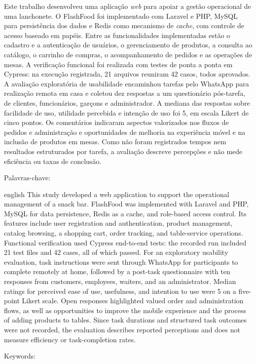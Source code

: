 \begin{resumo}
  \vspace{-15pt}
  
  Este trabalho desenvolveu uma aplicação \textit{web} para apoiar a gestão operacional de uma lanchonete. O FlashFood foi implementado com Laravel e PHP, MySQL para persistência dos dados e Redis como mecanismo de \textit{cache}, com controle de acesso baseado em papéis. Entre as funcionalidades implementadas estão o cadastro e a autenticação de usuários, o gerenciamento de produtos, a consulta ao catálogo, o carrinho de compras, o acompanhamento de pedidos e as operações de mesas. A verificação funcional foi realizada com testes de ponta a ponta em Cypress: na execução registrada, 21 arquivos reuniram 42 casos, todos aprovados. A avaliação exploratória de usabilidade encaminhou tarefas pelo WhatsApp para realização remota em casa e coletou dez respostas a um questionário pós-tarefa, de clientes, funcionários, garçons e administrador. A mediana das respostas sobre facilidade de uso, utilidade percebida e intenção de uso foi 5, em escala Likert de cinco pontos. Os comentários indicaram aspectos valorizados nos fluxos de pedidos e administração e oportunidades de melhoria na experiência móvel e na inclusão de produtos em mesas. Como não foram registrados tempos nem resultados estruturados por tarefa, a avaliação descreve percepções e não mede eficiência ou taxas de conclusão.

  Palavras-chave: \palavraschaveemlinha
\end{resumo}


\begin{resumo}[Abstract]
  \vspace{-15pt}
  
  \begin{otherlanguage*}{english}
  This study developed a web application to support the operational management of a snack bar. FlashFood was implemented with Laravel and PHP, MySQL for data persistence, Redis as a cache, and role-based access control. Its features include user registration and authentication, product management, catalog browsing, a shopping cart, order tracking, and table-service operations. Functional verification used Cypress end-to-end tests: the recorded run included 21 test files and 42 cases, all of which passed. For an exploratory usability evaluation, task instructions were sent through WhatsApp for participants to complete remotely at home, followed by a post-task questionnaire with ten responses from customers, employees, waiters, and an administrator. Median ratings for perceived ease of use, usefulness, and intention to use were 5 on a five-point Likert scale. Open responses highlighted valued order and administration flows, as well as opportunities to improve the mobile experience and the process of adding products to tables. Since task durations and structured task outcomes were not recorded, the evaluation describes reported perceptions and does not measure efficiency or task-completion rates.
  
  Keywords: \inlinekeywords
\end{otherlanguage*}
\end{resumo}
